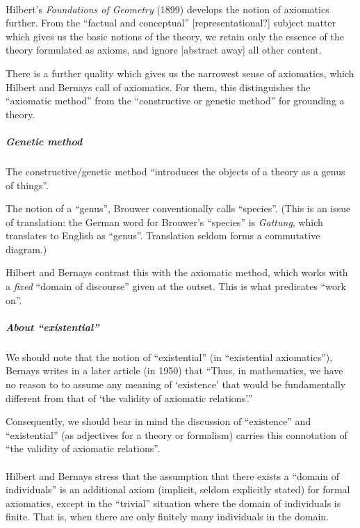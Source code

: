 \paragraph{} Hilbert's \textit{Foundations of Geometry} (1899)
develops the notion of axiomatics further. From the
``factual and conceptual'' [representational?] subject matter which
gives us the basic notions of the theory, we retain only the essence
of the theory formulated as axioms, and ignore [abstract away] all
other content.

There is a further quality which gives us the narrowest sense of
axiomatics, which Hilbert and Bernays call 
of axiomatics.
For them, this distinguishes the ``axiomatic method'' from the
``constructive or genetic method'' for grounding a theory.

\subparagraph{Genetic method}
The constructive/genetic method ``introduces the objects of a theory
as a genus of things''.

The notion of a ``genus'', Brouwer conventionally calls
``species''. (This is an issue of translation: the German word for
Brouwer's ``species'' is \textit{Gattung}, which translates to English
as ``genus''. Translation seldom forms a commutative diagram.)

Hilbert and Bernays contrast this with the axiomatic method, which
works with a \emph{fixed} ``domain of discourse'' given at the outset.
This is what predicates ``work on''.

\subparagraph{About ``existential''}\label{subpar:ch1:existential-form:about-existential}
We should note that the notion of ``existential'' (in
``existential axiomatics''), Bernays writes in a later article (in
1950) that ``Thus, in mathematics, we have no reason to to assume any
meaning of `existence' that would be fundamentally different from
that of `the validity of axiomatic relations'.''

Consequently, we should bear in mind the discussion of ``existence''
and ``existential'' (as adjectives for a theory or formalism) carries
this connotation of ``the validity of axiomatic relations''.

\paragraph{}
Hilbert and Bernays stress that the assumption that there exists a
``domain of individuals'' is an additional axiom (implicit, seldom
explicitly stated) for formal axiomatics, except in the ``trivial''
situation where the domain of individuals is finite. That is, when
there are only finitely many individuals in the domain.

